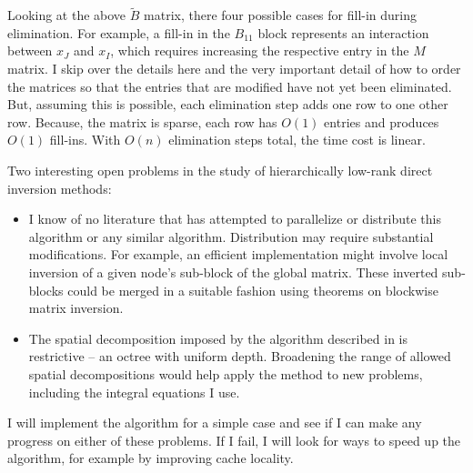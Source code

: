 \documentclass[a4paper]{article}
\begin{document}
Looking at the above $\widetilde{B}$ matrix, there four possible cases for fill-in during elimination. For example, a fill-in in the $B_{11}$ block represents an interaction between $x_J$ and $x_I$, which requires increasing the respective entry in the $M$ matrix. I skip over the details here and the very important detail of how to order the matrices so that the entries that are modified have not yet been eliminated. But, assuming this is possible, each elimination step adds one row to one other row. Because, the matrix is sparse, each row has $O(1)$ entries and produces $O(1)$ fill-ins. With $O(n)$ elimination steps total, the time cost is linear.

Two interesting open problems in the study of hierarchically low-rank direct inversion methods:
\begin{itemize}
    \item I know of no literature that has attempted to parallelize or distribute this algorithm or any similar algorithm. Distribution may require substantial modifications. For example, an efficient implementation might involve local inversion of a given node's sub-block of the global matrix. These inverted sub-blocks could be merged in a suitable fashion using theorems on blockwise matrix inversion. 
    \item The spatial decomposition imposed by the algorithm described in \citep{Ambikasaran2014} is restrictive -- an octree with uniform depth. Broadening the range of allowed spatial decompositions would help apply the method to new problems, including the integral equations I use.
\end{itemize}

I will implement the algorithm for a simple case and see if I can make any progress on either of these problems. If I fail, I will look for ways to speed up the algorithm, for example by improving cache locality.




\end{document}
